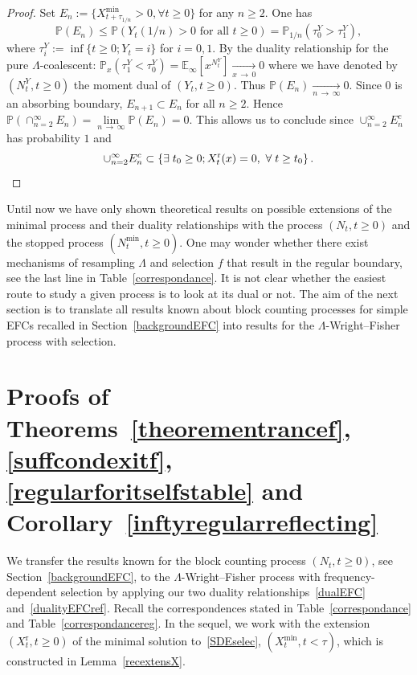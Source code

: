 \documentclass[AHL,Unicode,longabstracts,published]{cedram}
\newcommand{\rmr}{\mathrm{r}}
\newcommand{\bbE}{\mathbb{E}}
\newcommand{\bbP}{\mathbb{P}}
\let\oldexists\exists
\renewcommand*{\exists}{\mathrel{\oldexists}}
\let\oldforall\forall
\renewcommand*{\forall}{\mathrel{\oldforall}}
\begin{document}
\begin{proof}
Set $E_n:=\{X^{\min}_{t+\tau_{1/n}}>0, \forall t\geq 0\}$ for any $n\geq 2$. One has
\[
\bbP(E_n)\leq \bbP(Y_t(1/n)>0 \text{ for all } t\geq 0)=\bbP_{1/n}\left(\tau^Y_0>\tau^Y_1\right),
\]
where $\tau^Y_i:=\inf\{t\geq 0; Y_t=i\}$ for $i=0,1$. By the duality relationship for the pure $\Lambda$-coalescent: $\bbP_x(\tau^Y_1<\tau^Y_0)=\bbE_\infty[x^{N^{Y}_t}]\underset{x\,\rightarrow\,0}{\longrightarrow} 0$ where we have denoted by $(N_t^{Y},t\geq 0)$ the moment dual of $(Y_t,t\geq 0)$. Thus $\bbP(E_n)\underset{n\,\rightarrow\,\infty}{\longrightarrow} 0$. Since $0$ is an absorbing boundary, $E_{n+1}\subset E_n$ for all $n\geq 2$. Hence $\bbP\left(\cap_{n=2}^{\infty}E_n\right)=\underset{n\,\rightarrow\,\infty}{\lim} \bbP(E_n)=0.$ This allows us to conclude since $\cup_{n=2}^{\infty} E_n^{c}$ has probability $1$ and
\[
\cup_{n=2}^{\infty} E_n^{c}\subset \left\{\exists t_0\geq 0; X_t^{\rmr}(x)=0, \ \forall t\geq t_0\right\}.\qedhere
\]
\end{proof}

Until now we have only shown theoretical results on possible extensions of the minimal process and their duality relationships with the process $(N_t,t\geq 0)$ and the stopped process $(N^{\min}_{t},t\geq 0)$. One may wonder whether there exist mechanisms of resampling $\Lambda$ and selection $f$ that result in the regular boundary, see the last line in Table~\ref{correspondance}. It is not clear whether the easiest route to study a given process is to look at its dual or not. The aim of the next section is to translate all results known about block counting processes for simple EFCs recalled in Section~\ref{backgroundEFC} into results for the $\Lambda$-Wright--Fisher process with selection.


\section{Proofs of Theorems~\ref{theorementrancef}, \ref{suffcondexitf}, \ref{regularforitselfstable} and Corollary~\ref{inftyregularreflecting}}\label{application}


We transfer the results known for the block counting process $(N_t,t\geq 0)$, see Section~\ref{backgroundEFC}, to the $\Lambda$-Wright--Fisher process with frequency-dependent selection by applying our two duality relationships~\eqref{dualEFC} and~\eqref{dualityEFCref}. Recall the correspondences stated in Table~\ref{correspondance} and Table~\ref{correspondancereg}. In the sequel, we work with the extension $(X_t^{\rmr},t\geq 0)$ of the minimal solution to~\eqref{SDEselec}, $(X_t^{\min},t< \tau)$, which is constructed in Lemma~\ref{recextensX}.
\end{document}
